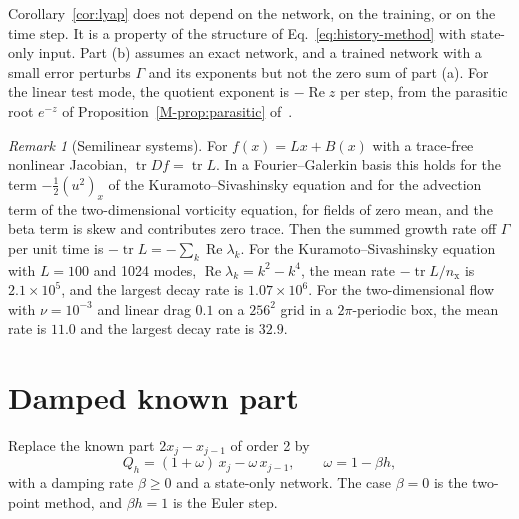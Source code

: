 \documentclass[11pt]{article}
\newcommand{\Mref}[1]{\ref{M-#1} of~\cite{main}}
\theoremstyle{definition}
\theoremstyle{remark}
\newtheorem*{remark}{Remark}
\newcommand{\Tr}{\operatorname{tr}}
\begin{document}
Corollary~\ref{cor:lyap} does not depend on the network, on the training, or on the time step.
It is a property of the structure of Eq.~\eqref{eq:history-method} with state-only input.
Part (b) assumes an exact network, and a trained network with a small error perturbs $\Gamma$ and its exponents but not the zero sum of part (a).
For the linear test mode, the quotient exponent is $-\operatorname{Re}z$ per step, from the parasitic root $e^{-z}$ of Proposition~\Mref{prop:parasitic}.

\begin{remark}[Semilinear systems]
For $f(x) = Lx + B(x)$ with a trace-free nonlinear Jacobian, $\Tr Df = \Tr L$.
In a Fourier--Galerkin basis this holds for the term $-\tfrac12(u^2)_x$ of the Kuramoto--Sivashinsky equation and for the advection term of the two-dimensional vorticity equation, for fields of zero mean, and the beta term is skew and contributes zero trace.
Then the summed growth rate off $\Gamma$ per unit time is $-\Tr L = -\sum_k\operatorname{Re}\lambda_k$.
For the Kuramoto--Sivashinsky equation with $L = 100$ and 1024 modes, $\operatorname{Re}\lambda_k = k^2 - k^4$, the mean rate $-\Tr L/n_{\mathrm x}$ is $2.1\times10^5$, and the largest decay rate is $1.07\times10^6$.
For the two-dimensional flow with $\nu = 10^{-3}$ and linear drag $0.1$ on a $256^2$ grid in a $2\pi$-periodic box, the mean rate is $11.0$ and the largest decay rate is $32.9$.
\end{remark}

\section{Damped known part}\label{sec:damped}

Replace the known part $2x_j - x_{j-1}$ of order 2 by
\begin{equation}\label{eq:damped}
Q_h = (1 + \omega)\,x_j - \omega\,x_{j-1}, \qquad \omega = 1 - \beta h,
\end{equation}
with a damping rate $\beta \ge 0$ and a state-only network.
The case $\beta = 0$ is the two-point method, and $\beta h = 1$ is the Euler step.
\end{document}
